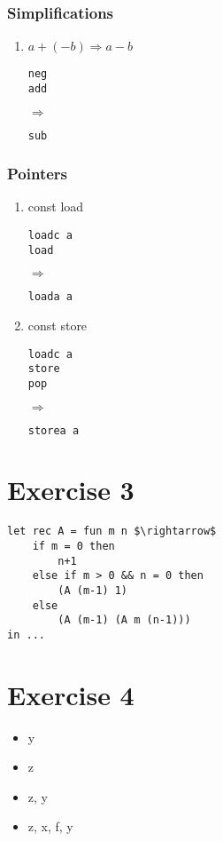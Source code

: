 \documentclass[10pt,a4paper]{article}
\begin{document}
	\subsubsection{Simplifications}
	\begin{enumerate}
	\item $a + (-b) \Rightarrow a - b$
		\begin{lstlisting}
neg
add
		\end{lstlisting}
		$\Rightarrow$
		\begin{lstlisting}
sub
		\end{lstlisting}
	\end{enumerate}	

	\subsubsection{Pointers}
	\begin{enumerate}
	\item const load
		\begin{lstlisting}
loadc a
load
		\end{lstlisting}
		$\Rightarrow$
		\begin{lstlisting}
loada a
		\end{lstlisting}
		
	\item const store
		\begin{lstlisting}
loadc a
store
pop
		\end{lstlisting}
		$\Rightarrow$
		\begin{lstlisting}
storea a
		\end{lstlisting}
	\end{enumerate}
	
	\section{Exercise 3}
	
	\begin{lstlisting}[mathescape]
let rec A = fun m n $\rightarrow$ 
	if m = 0 then 
		n+1 
	else if m > 0 && n = 0 then 
		(A (m-1) 1) 
	else
		(A (m-1) (A m (n-1)))
in ...
	\end{lstlisting}
	
	
	\section{Exercise 4}
	
	\begin{itemize}
		\item y
		\item z
		\item z, y
		\item z, x, f, y
	\end{itemize}
\end{document}
